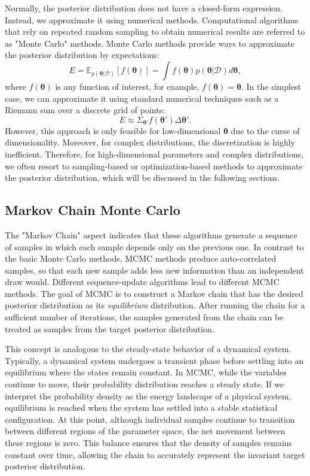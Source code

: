 Normally, the posterior distribution does not have a closed-form expression. Instead, we approximate it using numerical methods. Computational algorithms that rely on repeated random sampling to obtain numerical results are referred to as "Monte Carlo" methods. Monte Carlo methods provide ways to approximate the posterior distribution by expectations:
\begin{equation}
    E=\mathbb{E}_{p(\boldsymbol{\theta}|\mathcal{D})}[f(\boldsymbol{\theta})] = \int f(\boldsymbol{\theta}) p(\boldsymbol{\theta}|\mathcal{D}) d\boldsymbol{\theta},
\end{equation}
where $f(\boldsymbol{\theta})$ is any function of interest, for example, $f(\boldsymbol{\theta})=\boldsymbol{\theta}$. In the simplest case, we can approximate it using standard numerical techniques such as a Riemann sum over a discrete grid of points:
\begin{equation}
    E \approx \Sigma_{\boldsymbol{\theta}'} f(\boldsymbol{\theta}') \Delta \boldsymbol{\theta}'.
\end{equation}
However, this approach is only feasible for low-dimensional $\boldsymbol{\theta}$ due to the curse of dimensionality. Moreover, for complex distributions, the discretization is highly inefficient. Therefore, for high-dimensional parameters and complex distributions, we often resort to sampling-based or optimization-based methods to approximate the posterior distribution, which will be discussed in the following sections.

\subsection{Markov Chain Monte Carlo}
The "Markov Chain" aspect indicates that these algorithms generate a sequence of samples in which each sample depends only on the previous one. In contrast to the basic Monte Carlo methods, \acf{MCMC} methods produce auto-correlated samples, so that each new sample adds less new information than an independent draw would. Different sequence-update algorithms lead to different \ac{MCMC} methods. The goal of \ac{MCMC} is to construct a Markov chain that has the desired posterior distribution as its \textit{equilibrium} distribution. After running the chain for a sufficient number of iterations, the samples generated from the chain can be treated as samples from the target posterior distribution. 

This concept is analogous to the steady-state behavior of a dynamical system. Typically, a dynamical system undergoes a transient phase before settling into an equilibrium where the states remain constant. In \ac{MCMC}, while the variables continue to move, their probability distribution reaches a steady state. If we interpret the probability density as the energy landscape of a physical system, equilibrium is reached when the system has settled into a stable statistical configuration. At this point, although individual samples continue to transition between different regions of the parameter space, the net movement between these regions is zero. This balance ensures that the density of samples remains constant over time, allowing the chain to accurately represent the invariant target posterior distribution.

